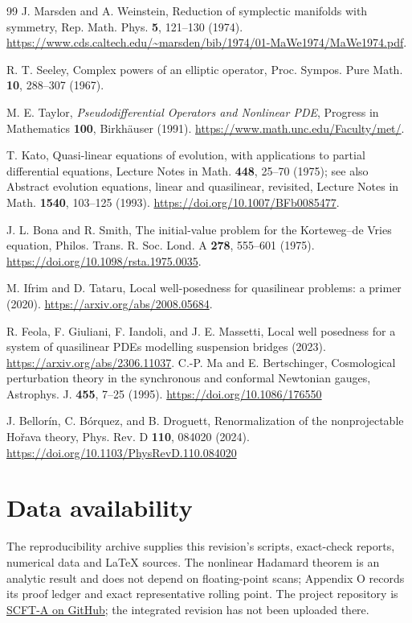 \documentclass[aps,prd,reprint,onecolumn,notitlepage,nofootinbib,longbibliography,floatfix]{revtex4-2}
\theoremstyle{scstyle}
\theoremstyle{definition}
\theoremstyle{remark}
\begin{document}
\begin{thebibliography}{99}
J. Marsden and A. Weinstein, Reduction of symplectic manifolds with symmetry,
Rep. Math. Phys. \textbf{5}, 121--130 (1974).
\url{https://www.cds.caltech.edu/~marsden/bib/1974/01-MaWe1974/MaWe1974.pdf}.

R. T. Seeley, Complex powers of an elliptic operator,
Proc. Sympos. Pure Math. \textbf{10}, 288--307 (1967).

M. E. Taylor, \textit{Pseudodifferential Operators and Nonlinear PDE},
Progress in Mathematics \textbf{100}, Birkh\"auser (1991).
\url{https://www.math.unc.edu/Faculty/met/}.

T. Kato, Quasi-linear equations of evolution, with applications to partial
differential equations, Lecture Notes in Math. \textbf{448}, 25--70 (1975);
see also Abstract evolution equations, linear and quasilinear, revisited,
Lecture Notes in Math. \textbf{1540}, 103--125 (1993).
\url{https://doi.org/10.1007/BFb0085477}.

J. L. Bona and R. Smith, The initial-value problem for the Korteweg--de Vries
equation, Philos. Trans. R. Soc. Lond. A \textbf{278}, 555--601 (1975).
\url{https://doi.org/10.1098/rsta.1975.0035}.

M. Ifrim and D. Tataru, Local well-posedness for quasilinear problems: a
primer (2020). \url{https://arxiv.org/abs/2008.05684}.

R. Feola, F. Giuliani, F. Iandoli, and J. E. Massetti,
Local well posedness for a system of quasilinear PDEs modelling suspension
bridges (2023). \url{https://arxiv.org/abs/2306.11037}.
C.-P. Ma and E. Bertschinger, Cosmological perturbation theory in the
synchronous and conformal Newtonian gauges, Astrophys. J. \textbf{455},
7--25 (1995). \url{https://doi.org/10.1086/176550}

J. Bellor\'in, C. B\'orquez, and B. Droguett,
Renormalization of the nonprojectable Ho\v rava theory,
Phys. Rev. D \textbf{110}, 084020 (2024).
\url{https://doi.org/10.1103/PhysRevD.110.084020}

\end{thebibliography}
\section*{Data availability}
The reproducibility archive supplies this revision's scripts, exact-check reports, numerical data and LaTeX sources. The nonlinear Hadamard theorem is an analytic result and does not depend on floating-point scans; Appendix O records its proof ledger and exact representative rolling point. The project repository is \href{https://github.com/mauromontenegro333/Space-Clock-Field-Theory-A}{SCFT-A on GitHub}; the integrated revision has not been uploaded there.
\end{document}
